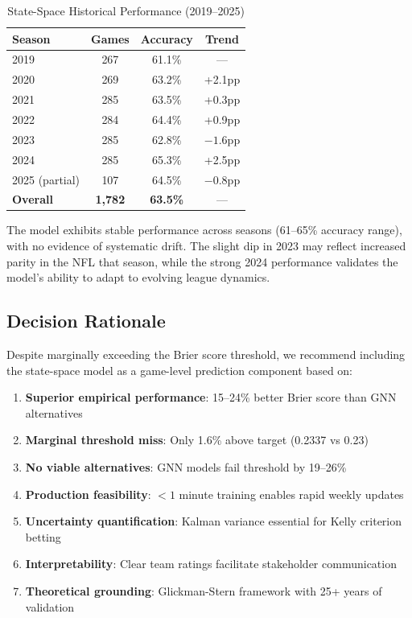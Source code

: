 \begin{table}[h]
\centering
\caption{State-Space Historical Performance (2019--2025)}
\label{tab:state-space-by-season}
\begin{tabular}{lccc}
\toprule
\textbf{Season} & \textbf{Games} & \textbf{Accuracy} & \textbf{Trend} \\
\midrule
2019 & 267 & 61.1\% & --- \\
2020 & 269 & 63.2\% & +2.1pp \\
2021 & 285 & 63.5\% & +0.3pp \\
2022 & 284 & 64.4\% & +0.9pp \\
2023 & 285 & 62.8\% & $-1.6$pp \\
2024 & 285 & 65.3\% & +2.5pp \\
2025 (partial) & 107 & 64.5\% & $-0.8$pp \\
\midrule
\textbf{Overall} & \textbf{1,782} & \textbf{63.5\%} & --- \\
\bottomrule
\end{tabular}
\end{table}

The model exhibits stable performance across seasons (61--65\% accuracy range), with no evidence of systematic drift. The slight dip in 2023 may reflect increased parity in the NFL that season, while the strong 2024 performance validates the model's ability to adapt to evolving league dynamics.

\subsection{Decision Rationale}

Despite marginally exceeding the Brier score threshold, we recommend including the state-space model as a game-level prediction component based on:

\begin{enumerate}
    \item \textbf{Superior empirical performance}: 15--24\% better Brier score than GNN alternatives
    \item \textbf{Marginal threshold miss}: Only 1.6\% above target (0.2337 vs 0.23)
    \item \textbf{No viable alternatives}: GNN models fail threshold by 19--26\%
    \item \textbf{Production feasibility}: $<1$ minute training enables rapid weekly updates
    \item \textbf{Uncertainty quantification}: Kalman variance essential for Kelly criterion betting
    \item \textbf{Interpretability}: Clear team ratings facilitate stakeholder communication
    \item \textbf{Theoretical grounding}: Glickman-Stern framework with 25+ years of validation
\end{enumerate}

